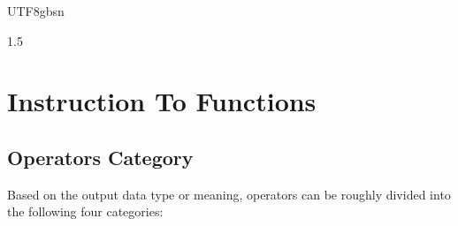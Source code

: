 \documentclass{article}
\begin{document}
\begin{CJK}{UTF8}{gbsn}
\begin{spacing}{1.5}
%
%
%
%
%
%

\section{Instruction To Functions}

\subsection{Operators Category}

Based on the output data type or meaning, operators can be roughly divided into the following four categories:\\




\end{spacing}
\end{CJK}
\end{document}
